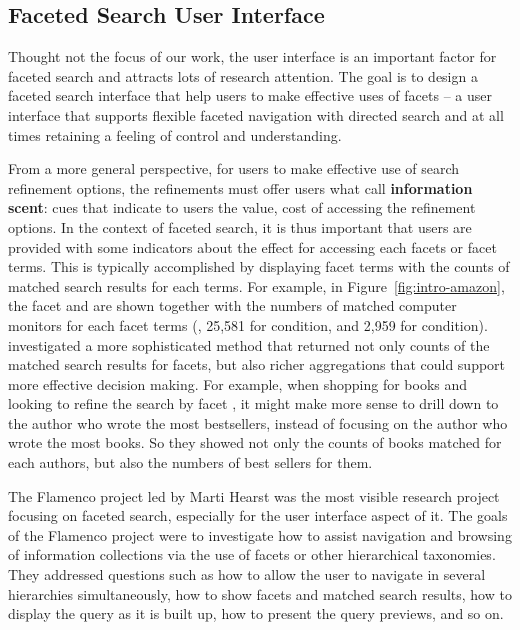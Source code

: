 \subsection{Faceted Search User Interface}
Thought not the focus of our work, the user interface is an important factor for faceted search and attracts lots of research attention. The goal is to design a faceted search interface that help users to make effective uses of facets -- a user interface that supports flexible faceted navigation with directed search and at all times retaining a feeling of control and understanding.

From a more general perspective, for users to make effective use of search refinement options, the refinements must offer users what \citet{pirolli2000effect} call \textbf{information scent}: cues that indicate to users the value, cost of accessing the refinement options. In the context of faceted search, it is thus important that users are provided with some indicators about the effect for accessing each facets or facet terms. This is typically accomplished by displaying facet terms with the counts of matched search results for each terms. For example, in Figure~\ref{fig:intro-amazon}, the facet  and  are shown together 
with the numbers of matched computer monitors for each facet terms (\eg, 25,581 for  condition, and 2,959 for  condition). \citet{ben2008beyond} investigated a more sophisticated method that returned not only counts of the matched search results for facets, but also richer aggregations that could support more effective decision making. For example, when shopping for books and looking to refine the search by facet , it might make more sense to drill down to the author who wrote the most bestsellers, instead of focusing on the author who wrote the most books. So they showed not only the counts of books matched for each authors, but also the numbers of best sellers for them.

The Flamenco project led by Marti Hearst was the most visible research project focusing on faceted search, especially for the user interface aspect of it. The goals of the Flamenco project were to investigate how to assist navigation and browsing of information collections via the use of facets or other hierarchical taxonomies. They addressed questions such as how to allow the user to navigate in several hierarchies simultaneously, how to show facets and matched search results, how to display the query as it is built up, how to present the query previews, and so on. 

